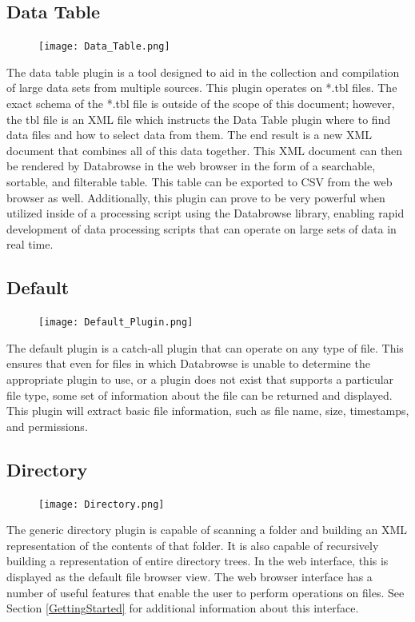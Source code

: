 \documentclass[10pt]{article}
\begin{document}
\subsection{Data Table}
\begin{figure}
		\texttt{[image: Data\_Table.png]}
\end{figure}
The data table plugin is a tool designed to aid in the collection and compilation of large data sets from multiple sources.  This plugin operates on *.tbl files.  The exact schema of the *.tbl file is outside of the scope of this document; however, the tbl file is an XML file which instructs the Data Table plugin where to find data files and how to select data from them.  The end result is a new XML document that combines all of this data together.  This XML document can then be rendered by Databrowse in the web browser in the form of a searchable, sortable, and filterable table.  This table can be exported to CSV from the web browser as well.  Additionally, this plugin can prove to be very powerful when utilized inside of a processing script using the Databrowse library, enabling rapid development of data processing scripts that can operate on large sets of data in real time.  

\endgroup


\begingroup
\setlength\intextsep{0pt}
\subsection{Default}
\begin{figure}
		\texttt{[image: Default\_Plugin.png]}
\end{figure}
The default plugin is a catch-all plugin that can operate on any type of file.  This ensures that even for files in which Databrowse is unable to determine the appropriate plugin to use, or a plugin does not exist that supports a particular file type, some set of information about the file can be returned and displayed.  This plugin will extract basic file information, such as file name, size, timestamps, and permissions.

\endgroup


\clearpage
\begingroup
\setlength\intextsep{0pt}
\subsection{Directory}
\begin{figure}
		\texttt{[image: Directory.png]}
\end{figure}
The generic directory plugin is capable of scanning a folder and building an XML representation of the contents of that folder.  It is also capable of recursively building a representation of entire directory trees.  In the web interface, this is displayed as the default file browser view.  The web browser interface has a number of useful features that enable the user to perform operations on files.  See Section \ref{GettingStarted} for additional information about this interface.
\end{document}

